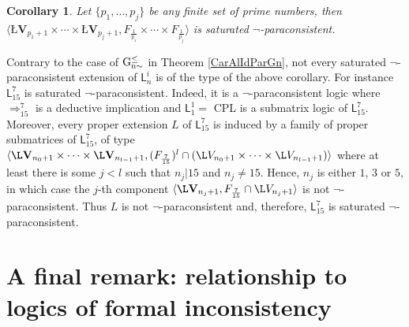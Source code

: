 \documentclass{article}
\newtheorem{corollary}{Corollary}
\theoremstyle{definition}
\newcommand{\algLfin}{\textbf{\L}\mathbf{V}}
\newcommand{\domLfin}{{\L}V}
\begin{document}
\begin{corollary}\label{coro}
Let $\{p_{1},\ldots, p_{j}\}$ be any finite set of prime numbers, then $\langle \algLfin_{p_{1}+1}\times\cdots\times\algLfin_{p_{j}+1}, F_{\frac{1}{p_{1}}}\times\cdots\times F_{\frac{1}{p_{j}}}\rangle$ is saturated $\neg$-paraconsistent.
\end{corollary}

Contrary to the case of $\rm{G}_{n \sim}^\leq$ in Theorem \ref{CarAlIdParGn}, not every saturated $\neg$-paracon\-sis\-tent extension of $\mathsf{L}_{n}^{i}$ is of the type of the above corollary. For instance $\mathsf{L}_{15}^{7}$ is saturated $\neg$-paraconsistent. Indeed, it is a $\neg$-paraconsistent logic where $\Rightarrow^{7}_{15}$ is a deductive implication and $\mathsf{L}_{1}^{1}=$ CPL is a submatrix logic of $\mathsf{L}_{15}^{7}$. Moreover, every proper extension $L$ of $\mathsf{L}_{15}^{7}$ is induced by a family of proper submatrices of $\mathsf{L}_{15}^{7}$, of type $\langle \algLfin_{n_{0}+1}\times\cdots\times\algLfin_{n_{l-1}+1}, (F_{\frac{7}{15}})^{l}\cap (\domLfin_{n_{0}+1}\times\cdots\times \domLfin_{n_{l-1}+1}) \rangle$ where at least there is some $j<l$ such that $n_{j}|15$ and $n_{j}\neq 15$. Hence, $n_{j}$ is either $1$, $3$ or $5$, in which case the $j$-th component $\langle \algLfin_{n_{j}+1},F_{\frac{7}{15}}\cap \domLfin_{n_{j}+1} \rangle$ is not $\neg$-paraconsistent. Thus $L$ is not $\neg$-paraconsistent and,  therefore, $\mathsf{L}_{15}^{7}$ is saturated $\neg$-paraconsistent.

\section{A final remark: relationship to logics of formal inconsistency}
\end{document}
